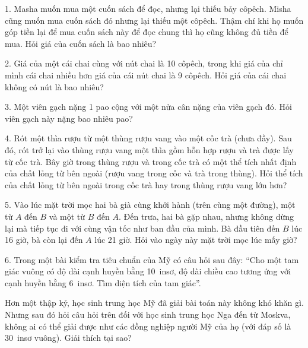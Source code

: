 \begin{problem}{1.}
	Masha muốn mua một cuốn sách để đọc, nhưng lại thiếu bảy côpêch. Misha cũng muốn mua cuốn sách đó nhưng lại thiếu một côpêch. Thậm chí khi họ muốn góp tiền lại để mua cuốn sách này để đọc chung thì họ cũng không đủ tiền để mua. Hỏi giá của cuốn sách là bao nhiêu?
\end{problem}

\begin{problem}{2.}
	Giá của một cái chai cùng với nút chai là 10 côpêch, trong khi giá của chỉ mình cái chai nhiều hơn giá của cái nút chai là 9 côpêch. Hỏi giá của cái chai không có nút là bao nhiêu?
\end{problem}

\begin{problem}{3.}
	Một viên gạch nặng 1 pao cộng với một nửa cân nặng của viên gạch đó. Hỏi viên gạch này nặng bao nhiêu pao?
\end{problem}

\begin{problem}{4.}
	Rót một thìa rượu từ một thùng rượu vang vào một cốc trà (chưa đầy). Sau đó, rót trở lại vào thùng rượu vang một thìa gồm hỗn hợp rượu và trà được lấy từ cốc trà. Bây giờ trong thùng rượu và trong cốc trà có một thể tích nhất định của chất lỏng từ bên ngoài (rượu vang trong cốc và trà trong thùng). Hỏi thể tích của chất lỏng từ bên ngoài trong cốc trà hay trong thùng rượu vang lớn hơn?
\end{problem}

\begin{problem}{5.}
	Vào lúc mặt trời mọc hai bà già cùng khởi hành (trên cùng một đường), một từ $A$ đến $B$ và một từ $B$ đến $A$. Đến trưa, hai bà gặp nhau, nhưng không dừng lại mà tiếp tục đi với cùng vận tốc như ban đầu của mình. Bà đầu tiên đến $B$ lúc 16 giờ, bà còn lại đến $A$ lúc 21 giờ. Hỏi vào ngày này mặt trời mọc lúc mấy giờ?
\end{problem}

\begin{problem}{6.}
	Trong một bài kiểm tra tiêu chuẩn của Mỹ có câu hỏi sau đây: \enquote{Cho một tam giác vuông có độ dài cạnh huyền bằng 10~insơ, độ dài chiều cao tương ứng với cạnh huyền bằng 6~insơ. Tìm diện tích của tam giác}.

	Hơn một thập kỷ, học sinh trung học Mỹ đã giải bài toán này không khó khăn gì. Nhưng sau đó hỏi câu hỏi trên đối với học sinh trung học Nga đến từ Moskva, không ai có thể giải được như các đồng nghiệp người Mỹ của họ (với đáp số là 30~insơ vuông). Giải thích tại sao?
\end{problem}

